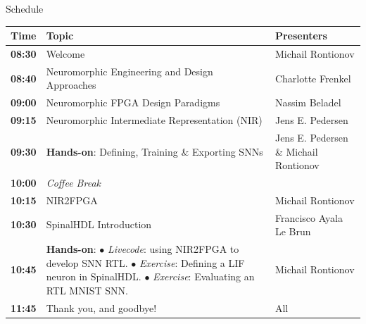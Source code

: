\documentclass[aspectratio=169]{beamer}
\begin{document}
\begin{frame}{Schedule}
  \centering
  \small
  \renewcommand{\arraystretch}{1.2}
  \begin{tabular}{>{\columncolor{uosblue}\color{white}\bfseries}l l l}
    \toprule
    \rowcolor{uosblue}\color{white}\textbf{Time} & \color{white}\textbf{Topic} & \color{white}\textbf{Presenters} \\
    \midrule
    08:30 & Welcome                                         & Michail Rontionov \\
    \rowcolor{uosblue!15}
    \color{black}08:40 & Neuromorphic Engineering and Design Approaches  & Charlotte Frenkel \\
    09:00 & Neuromorphic FPGA Design Paradigms         & Nassim Beladel \\
    \rowcolor{uosblue!15}
    \color{black}09:15 & Neuromorphic Intermediate Representation (NIR)  & Jens E. Pedersen \\
    09:30 & \textbf{Hands-on}: Defining, Training \& Exporting SNNs  & Jens E. Pedersen \& Michail Rontionov \\
    \rowcolor{uosblue!15}
    \color{black}10:00 & \textit{Coffee Break}                           &           \\
    10:15 & NIR2FPGA                     & Michail Rontionov \\
    \rowcolor{uosblue!15}
    \color{black}10:30 & SpinalHDL Introduction                     & Francisco Ayala Le Brun\\
    10:45 & \makecell[l]{\textbf{Hands-on}:\\ \scriptsize$\bullet$ \emph{Livecode}: using NIR2FPGA to develop SNN RTL.\\ \scriptsize$\bullet$ \emph{Exercise}: Defining a LIF neuron in SpinalHDL.\\ \scriptsize$\bullet$ \emph{Exercise}: Evaluating an RTL MNIST SNN.} & Michail Rontionov\\
    \rowcolor{uosblue!15}
    \color{black}11:45 & Thank you, and goodbye! & All \\
    \bottomrule
  \end{tabular}
\end{frame}
\end{document}
